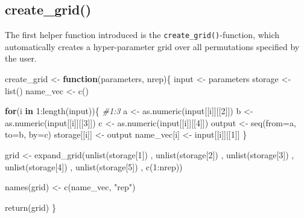 \documentclass[11pt,a4paper]{article}
\newenvironment{Shaded}{\begin{snugshade}}{\end{snugshade}}
\newcommand{\AttributeTok}[1]{\textcolor[rgb]{0.77,0.63,0.00}{#1}}
\newcommand{\CommentTok}[1]{\textcolor[rgb]{0.56,0.35,0.01}{\textit{#1}}}
\newcommand{\ControlFlowTok}[1]{\textcolor[rgb]{0.13,0.29,0.53}{\textbf{#1}}}
\newcommand{\DecValTok}[1]{\textcolor[rgb]{0.00,0.00,0.81}{#1}}
\newcommand{\FunctionTok}[1]{\textcolor[rgb]{0.00,0.00,0.00}{#1}}
\newcommand{\NormalTok}[1]{#1}
\newcommand{\OtherTok}[1]{\textcolor[rgb]{0.56,0.35,0.01}{#1}}
\newcommand{\SpecialCharTok}[1]{\textcolor[rgb]{0.00,0.00,0.00}{#1}}
\newcommand{\StringTok}[1]{\textcolor[rgb]{0.31,0.60,0.02}{#1}}
\begin{document}
\hypertarget{create_grid}{%
\subsection{create\_grid()}\label{create_grid}}

The first helper function introduced is the
\texttt{create\_grid()}-function, which automatically creates a
hyper-parameter grid over all permutations specified by the user.

\begin{Shaded}
\begin{Highlighting}[]
\NormalTok{create\_grid }\OtherTok{\textless{}{-}} \ControlFlowTok{function}\NormalTok{(parameters, nrep)\{}
\NormalTok{  input }\OtherTok{\textless{}{-}}\NormalTok{ parameters}
\NormalTok{  storage }\OtherTok{\textless{}{-}} \FunctionTok{list}\NormalTok{()}
\NormalTok{  name\_vec }\OtherTok{\textless{}{-}} \FunctionTok{c}\NormalTok{()}
  
  \ControlFlowTok{for}\NormalTok{(i }\ControlFlowTok{in} \DecValTok{1}\SpecialCharTok{:}\FunctionTok{length}\NormalTok{(input))\{ }\CommentTok{\#1:3}
\NormalTok{    a }\OtherTok{\textless{}{-}} \FunctionTok{as.numeric}\NormalTok{(input[[i]][[}\DecValTok{2}\NormalTok{]])}
\NormalTok{    b }\OtherTok{\textless{}{-}} \FunctionTok{as.numeric}\NormalTok{(input[[i]][[}\DecValTok{3}\NormalTok{]])}
\NormalTok{    c }\OtherTok{\textless{}{-}} \FunctionTok{as.numeric}\NormalTok{(input[[i]][[}\DecValTok{4}\NormalTok{]])}
\NormalTok{    output }\OtherTok{\textless{}{-}} \FunctionTok{seq}\NormalTok{(}\AttributeTok{from=}\NormalTok{a, }\AttributeTok{to=}\NormalTok{b, }\AttributeTok{by=}\NormalTok{c)}
\NormalTok{    storage[[i]] }\OtherTok{\textless{}{-}}\NormalTok{  output}
\NormalTok{    name\_vec[i] }\OtherTok{\textless{}{-}}\NormalTok{ input[[i]][[}\DecValTok{1}\NormalTok{]]}
\NormalTok{  \}}
  
\NormalTok{  grid }\OtherTok{\textless{}{-}} \FunctionTok{expand\_grid}\NormalTok{(}\FunctionTok{unlist}\NormalTok{(storage[}\DecValTok{1}\NormalTok{])}
\NormalTok{                      , }\FunctionTok{unlist}\NormalTok{(storage[}\DecValTok{2}\NormalTok{])}
\NormalTok{                      , }\FunctionTok{unlist}\NormalTok{(storage[}\DecValTok{3}\NormalTok{])}
\NormalTok{                      , }\FunctionTok{unlist}\NormalTok{(storage[}\DecValTok{4}\NormalTok{])}
\NormalTok{                      , }\FunctionTok{unlist}\NormalTok{(storage[}\DecValTok{5}\NormalTok{])}
\NormalTok{                      , }\FunctionTok{c}\NormalTok{(}\DecValTok{1}\SpecialCharTok{:}\NormalTok{nrep))}
  
  \FunctionTok{names}\NormalTok{(grid) }\OtherTok{\textless{}{-}} \FunctionTok{c}\NormalTok{(name\_vec, }\StringTok{"rep"}\NormalTok{)}
  
  \FunctionTok{return}\NormalTok{(grid)}
\NormalTok{\}}
\end{Highlighting}
\end{Shaded}
\end{document}
